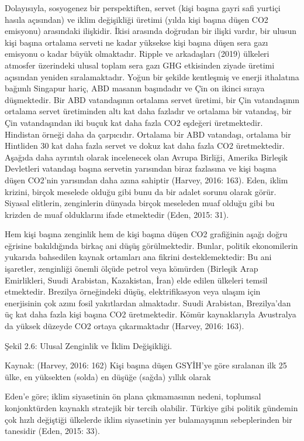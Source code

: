 \documentclass[
]{book}
\begin{document}
Dolayısıyla, sosyogenez bir perspektiften, servet (kişi başına gayri safi yurtiçi hasıla açısından) ve iklim değişikliği üretimi (yılda kişi başına düşen CO2 emisyonu) arasındaki ilişkidir. İkisi arasında doğrudan bir ilişki vardır, bir ulusun kişi başına ortalama serveti ne kadar yüksekse kişi başına düşen sera gazı emisyonu o kadar büyük olmaktadır. Ripple ve arkadaşları (2019) ülkeleri atmosfer üzerindeki ulusal toplam sera gazı GHG etkisinden ziyade üretimi açısından yeniden sıralamaktadır. Yoğun bir şekilde kentleşmiş ve enerji ithalatına bağımlı Singapur hariç, ABD masanın başındadır ve Çin on ikinci sıraya düşmektedir. Bir ABD vatandaşının ortalama servet üretimi, bir Çin vatandaşının ortalama servet üretiminden altı kat daha fazladır ve ortalama bir vatandaş, bir Çin vatandaşından iki buçuk kat daha fazla CO2 eşdeğeri üretmektedir. Hindistan örneği daha da çarpıcıdır. Ortalama bir ABD vatandaşı, ortalama bir Hintliden 30 kat daha fazla servet ve dokuz kat daha fazla CO2 üretmektedir. Aşağıda daha ayrıntılı olarak incelenecek olan Avrupa Birliği, Amerika Birleşik Devletleri vatandaşı başına servetin yarısından biraz fazlasına ve kişi başına düşen CO2'nin yarısından daha azına sahiptir (Harvey, 2016: 163). Eden, iklim krizini, birçok meselede olduğu gibi bunu da bir adalet sorunu olarak görür. Siyasal elitlerin, zenginlerin dünyada birçok meseleden muaf olduğu gibi bu krizden de muaf olduklarını ifade etmektedir (Eden, 2015: 31).

Hem kişi başına zenginlik hem de kişi başına düşen CO2 grafiğinin aşağı doğru eğrisine bakıldığında birkaç ani düşüş görülmektedir. Bunlar, politik ekonomilerin yukarıda bahsedilen kaynak ortamları ana fikrini desteklemektedir: Bu ani işaretler, zenginliği önemli ölçüde petrol veya kömürden (Birleşik Arap Emirlikleri, Suudi Arabistan, Kazakistan, İran) elde edilen ülkeleri temsil etmektedir. Brezilya örneğindeki düşüş, elektrifikasyon veya ulaşım için enerjisinin çok azını fosil yakıtlardan almaktadır. Suudi Arabistan, Brezilya'dan üç kat daha fazla kişi başına CO2 üretmektedir. Kömür kaynaklarıyla Avustralya da yüksek düzeyde CO2 ortaya çıkarmaktadır (Harvey, 2016: 163).

Şekil 2.6: Ulusal Zenginlik ve İklim Değişikliği.

Kaynak: (Harvey, 2016: 162) Kişi başına düşen GSYİH'ye göre sıralanan ilk 25 ülke, en yüksekten (solda) en düşüğe (sağda) yıllık olarak

Eden'e göre; iklim siyasetinin ön plana çıkmamasının nedeni, toplumsal konjonktürden kaynaklı stratejik bir tercih olabilir. Türkiye gibi politik gündemin çok hızlı değiştiği ülkelerde iklim siyasetinin yer bulamayışının sebeplerinden bir tanesidir (Eden, 2015: 33).
\end{document}
